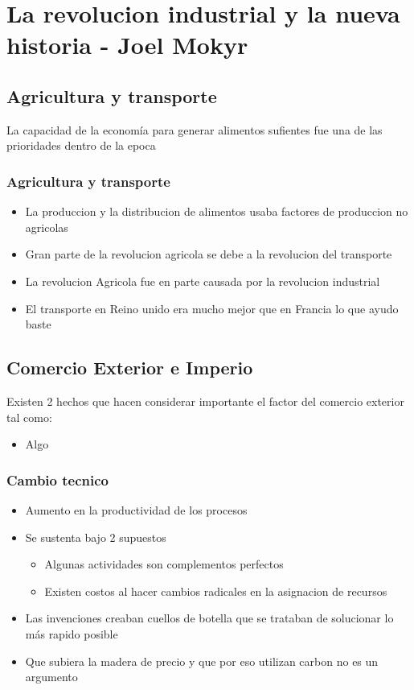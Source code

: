 \section{La revolucion industrial y la nueva historia - Joel Mokyr}

\subsection{Agricultura y transporte}
La capacidad de la economía para generar alimentos sufientes fue una de las prioridades dentro de la epoca 

\subsubsection{Agricultura y transporte}
\begin{itemize}
  \item La produccion y la distribucion de alimentos usaba factores de produccion no agricolas
  \item Gran parte de la revolucion agricola se debe a la revolucion del transporte 
  \item La revolucion Agricola fue en parte causada por la revolucion industrial
  \item El transporte en Reino unido era mucho mejor que en Francia lo que ayudo baste
\end{itemize}

\subsection{Comercio Exterior e Imperio}
Existen 2 hechos que hacen considerar importante el factor del comercio exterior tal como: 
\begin{itemize}
  \item Algo
\end{itemize}

\subsubsection{Cambio tecnico}
\begin{itemize}
  \item Aumento en la productividad de los procesos
  \item Se sustenta bajo 2 supuestos
  \begin{itemize}
    \item Algunas actividades son complementos perfectos
    \item Existen costos al hacer cambios radicales en la asignacion de recursos
  \end{itemize}
  \item Las invenciones creaban cuellos de botella que se trataban de solucionar lo más rapido posible
  \item Que subiera la madera de precio y que por eso utilizan carbon no es un argumento
\end{itemize}